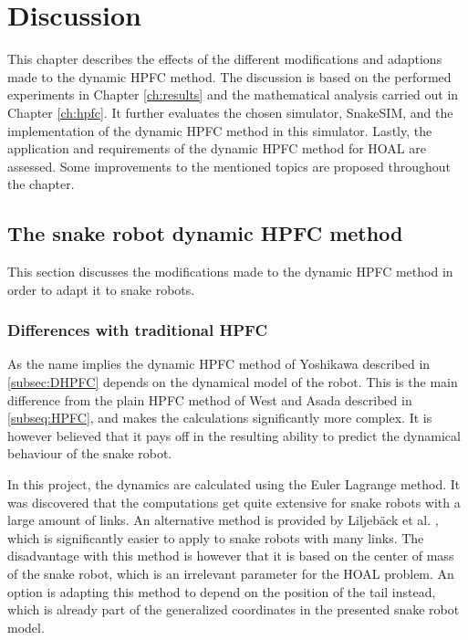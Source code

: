 \chapter{Discussion}\label{ch:discussion}

This chapter describes the effects of the different modifications and adaptions made to the dynamic HPFC method. The discussion is based on the performed experiments in Chapter \ref{ch:results} and the mathematical analysis carried out in Chapter \ref{ch:hpfc}. It further evaluates the chosen simulator, SnakeSIM, and the implementation of the dynamic HPFC method in this simulator. Lastly, the application and requirements of the dynamic HPFC method for HOAL are assessed. Some improvements to the mentioned topics are proposed throughout the chapter.

\section{The snake robot dynamic HPFC method}

This section discusses the modifications made to the dynamic HPFC method in order to adapt it to snake robots.

\subsection{Differences with traditional HPFC}\label{subsec:dis-diff}

As the name implies the dynamic HPFC method of Yoshikawa \cite{yoshikawa1987dynamic} described in \ref{subsec:DHPFC} depends on the dynamical model of the robot. This is the main difference from the plain HPFC method of West and Asada \cite{west1985method} described in \ref{subseq:HPFC}, and makes the calculations significantly more complex. It is however believed that it pays off in the resulting ability to predict the dynamical behaviour of the snake robot.

In this project, the dynamics are calculated using the Euler Lagrange method. It was discovered that the computations get quite extensive for snake robots with a large amount of links. An alternative method is provided by Liljebäck et al. \cite{liljeback2012snake}, which is significantly easier to apply to snake robots with many links. The disadvantage with this method is however that it is based on the center of mass of the snake robot, which is an irrelevant parameter for the HOAL problem. %
An option is adapting this method to depend on the position of the tail instead, which is already part of the generalized coordinates in the presented snake robot model.

